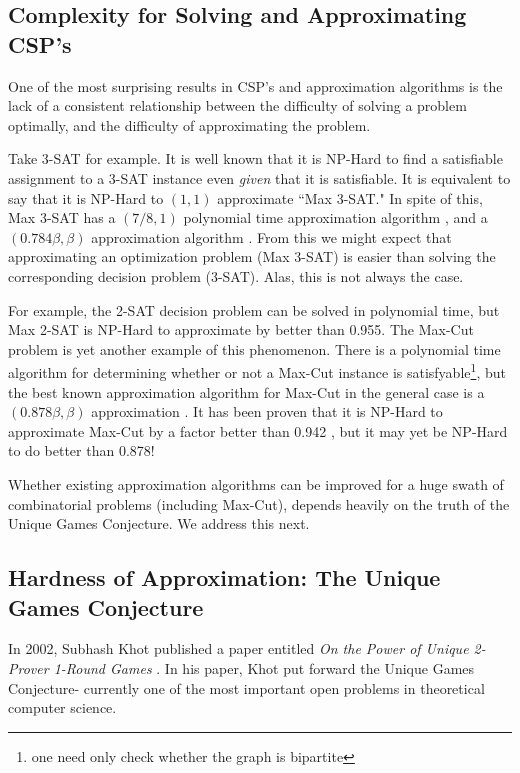 \subsection{Complexity for Solving and Approximating CSP's}
One of the most surprising results in CSP's and approximation algorithms is the lack of a consistent relationship between the difficulty of solving a problem optimally, and the difficulty of approximating the problem.

Take 3-SAT for example. 
It is well known that it is NP-Hard to find a satisfiable assignment to a 3-SAT instance even \textit{given} that it is satisfiable. 
It is equivalent to say that it is NP-Hard to $(1,1)$ approximate ``Max 3-SAT." 
In spite of this, Max 3-SAT has a $(7/8,1)$ polynomial time approximation algorithm \cite{Zwick1997}, and a $(0.784\beta,\beta)$ approximation algorithm \cite{AsanoAndWilliamson2002}.
From this we might expect that approximating an optimization problem (Max 3-SAT) is easier than solving the corresponding decision problem (3-SAT). 
Alas, this is not always the case. 

For example, the 2-SAT decision problem can be solved in polynomial time, but Max 2-SAT is NP-Hard to approximate by better than 0.955. \cite{Hastad2001}
The Max-Cut problem is yet another example of this phenomenon. 
There is a polynomial time algorithm for determining whether or not a Max-Cut instance is satisfyable\footnote{one need only check whether the graph is bipartite}, 
but the best known approximation algorithm for Max-Cut in the general case is a $(0.878\beta,\beta)$ approximation \cite{gwFirstMaxCutSDP}. 
It has been proven that it is NP-Hard to approximate Max-Cut by a factor better than 0.942 \cite{Trevisan2000}, 
but it may yet be NP-Hard to do better than 0.878! 

Whether existing approximation algorithms can be improved for a huge swath of combinatorial problems (including Max-Cut), depends heavily on the truth of the Unique Games Conjecture. 
We address this next.

\subsection{Hardness of Approximation: The Unique Games Conjecture} 
In 2002, Subhash Khot published a paper entitled \textit{On the Power of Unique 2-Prover 1-Round Games} \cite{Khot}. 
In his paper, Khot put forward the Unique Games Conjecture- currently one of the most important open problems in theoretical computer science.

